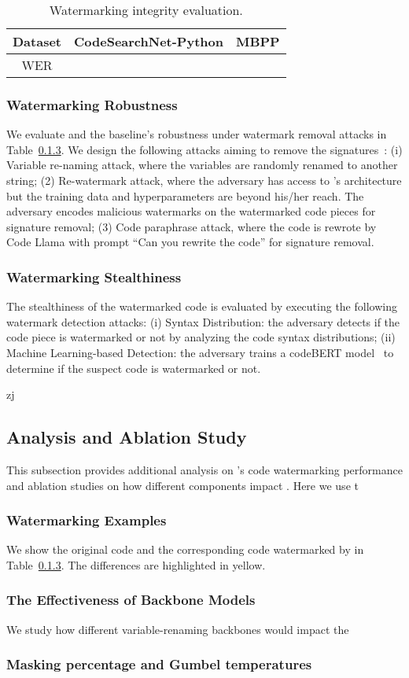 \begin{table}[!ht]
    \centering
    \small
    \begin{tabular}{c|cc}
    \toprule
    Dataset & CodeSearchNet-Python & MBPP \\\hline
    WER &  \\
    \bottomrule
    \end{tabular}
    \caption{Watermarking integrity evaluation.}
    \label{tab:integraity}
\end{table}


\subsubsection{Watermarking Robustness} 
We evaluate \sys{} and the baseline's robustness under watermark removal attacks in Table~\ref{}. We design the following attacks aiming to remove the signatures~\cite{yang2024srcmarker,lee2023wrote}: (i) Variable re-naming attack, where the variables are randomly renamed to another string; (2) Re-watermark attack, where the adversary has access to \sys's architecture but the training data and hyperparameters are beyond his/her reach. The adversary encodes malicious watermarks on the watermarked code pieces for signature removal; (3) Code paraphrase attack, where the code is rewrote by Code Llama with prompt ``Can you rewrite the code'' for signature removal. 

\subsubsection{Watermarking Stealthiness}
The stealthiness of the watermarked code is evaluated by executing the following watermark detection attacks: (i) Syntax Distribution: the adversary detects if the code piece is watermarked or not by analyzing the code syntax distributions; (ii) Machine Learning-based Detection: the adversary trains a codeBERT model~\cite{feng2020codebert} to determine if the suspect code is watermarked or not.


zj

\subsection{Analysis and Ablation Study}
This subsection provides additional analysis on \sys's code watermarking performance and ablation studies on how different components impact \sys. Here we use t

\subsubsection{Watermarking Examples}
We show the original code and the corresponding code watermarked by \sys{} in Table~\ref{}. The differences are highlighted in yellow. 


\subsubsection{The Effectiveness of Backbone Models} 
We study how different variable-renaming backbones would impact the 


\subsubsection{Masking percentage and Gumbel temperatures}